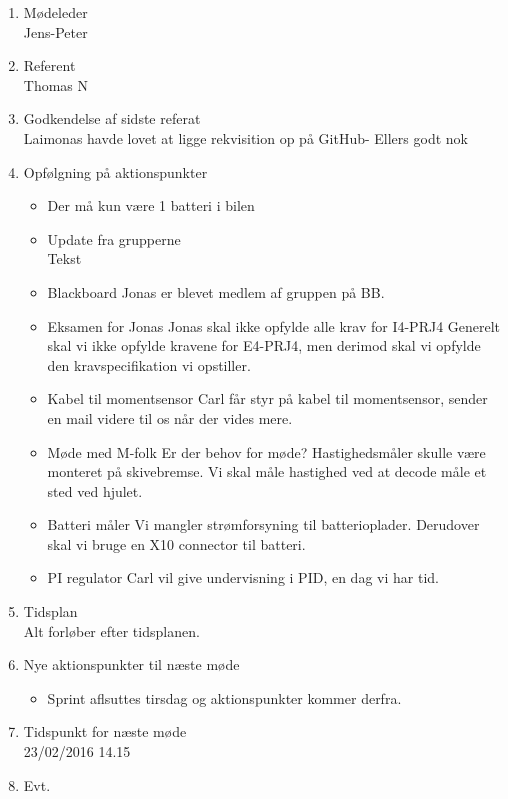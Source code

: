 	\begin{enumerate}
		\itemsep 0.3em 
		\item Mødeleder\\
			Jens-Peter
		\item Referent\\
			Thomas N
		\item Godkendelse af sidste referat\\
			Laimonas havde lovet at ligge rekvisition op på GitHub- Ellers godt nok
		\item Opfølgning på aktionspunkter
		\begin{itemize}
			\itemsep 0.3em 
			\item Der må kun være 1 batteri i bilen\\
				
			\item Update fra grupperne\\
				Tekst
			\item Blackboard
				Jonas er blevet medlem af gruppen på BB.
			\item Eksamen for Jonas
				Jonas skal ikke opfylde alle krav for I4-PRJ4
				Generelt skal vi ikke opfylde kravene for E4-PRJ4, men derimod skal vi opfylde den kravspecifikation vi opstiller. 
			\item Kabel til momentsensor
				Carl får styr på kabel til momentsensor, sender en mail videre til os når der vides mere. 
			\item Møde med M-folk
				Er der behov for møde? Hastighedsmåler skulle være monteret på skivebremse.
				Vi skal måle hastighed ved at decode måle et sted ved hjulet.
			\item Batteri måler
				Vi mangler strømforsyning til batterioplader.
				Derudover skal vi bruge en X10 connector til batteri. 
			\item PI regulator
				Carl vil give undervisning i PID, en dag vi har tid.
		\end{itemize}
		\item Tidsplan\\
			Alt forløber efter tidsplanen.
		\item Nye aktionspunkter til næste møde
		\begin{itemize}
			\itemsep 0.3em 
		\item Sprint aflsuttes tirsdag og aktionspunkter kommer derfra.
		\end{itemize}
		\item Tidspunkt for næste møde\\
			23/02/2016 14.15
		\item Evt.
		
	\end{enumerate}
